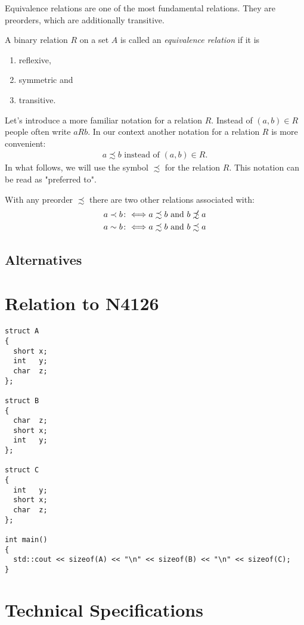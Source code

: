 ﻿\documentclass[a4paper,11pt,final]{article}
\newcommand\nprecsim{\mathrel{\ooalign{$\precsim$\cr
  \hidewidth\raise.225ex\hbox{$\slash\mkern.5mu$}\cr}}}
\begin{document}
Equivalence relations are one of the most fundamental relations. They are preorders, which are additionally transitive.
\begin{defi}
A binary relation $R$ on a set $A$ is called an \emph{equivalence relation} if it is
\begin{enumerate}
\item reflexive,
\item symmetric and
\item transitive.
\end{enumerate}
\end{defi}

Let's introduce a more familiar notation for a relation $R$. Instead of $(a,b)\in R$ people often write $aRb$. In our context another notation for a relation $R$ is more convenient:
\begin{gather*}
a \precsim b \text{ instead of } (a,b)\in R.
\end{gather*}
In what follows, we will use the symbol $\precsim$ for the relation $R$. This notation can be read as "preferred to".\par
With any preorder $\precsim$ there are two other relations associated with:
\begin{align*}
a \prec b&\colon\Longleftrightarrow a\precsim b\text{ and } b\nprecsim a\\
a \sim b&\colon\Longleftrightarrow a\precsim b\text{ and } b\precsim a
\end{align*}

\subsection{Alternatives}

\section{Relation to N4126}
\begin{lstlisting}
struct A
{
  short x;
  int   y;
  char  z;
};

struct B
{
  char  z;
  short x;
  int   y; 
};

struct C
{
  int   y;
  short x;
  char  z;
};

int main()
{
  std::cout << sizeof(A) << "\n" << sizeof(B) << "\n" << sizeof(C);
}
\end{lstlisting}

\section{Technical Specifications}
\end{document}

